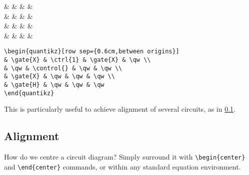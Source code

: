 \documentclass[aps,pra,10pt,nofootinbib]{revtex4}
\begin{document}
\begin{Code}
\begin{center}
\begin{quantikz}[row sep={0.6cm,between origins}]
&  &  &  & \qw \\
& \qw & \control{} & \qw & \qw \\
&  & \qw & \qw & \qw \\
&  & \qw & \qw & \qw 

\end{quantikz}
\end{center}
\tcblower
\begin{lstlisting}
\begin{quantikz}[row sep={0.6cm,between origins}]
& \gate{X} & \ctrl{1} & \gate{X} & \qw \\
& \qw & \control{} & \qw & \qw \\
& \gate{X} & \qw & \qw & \qw \\
& \gate{H} & \qw & \qw & \qw 
\end{quantikz}
\end{lstlisting}
\end{Code}
This is particularly useful to achieve alignment of several circuits, as in \ref{sec:align}.

\subsection{Alignment}\label{sec:align}

How do we centre a circuit diagram? Simply surround it with \verb!\begin{center}! and \verb!\end{center}! commands, or within any standard equation environment.
\end{document}
